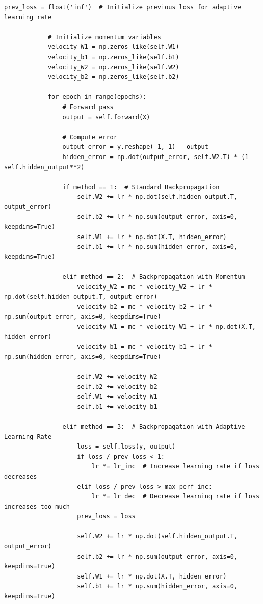\documentclass[a4paper,12pt]{article}
\begin{document}
\begin{lstlisting}[style=python]
            prev_loss = float('inf')  # Initialize previous loss for adaptive learning rate
    
            # Initialize momentum variables
            velocity_W1 = np.zeros_like(self.W1)  
            velocity_b1 = np.zeros_like(self.b1)  
            velocity_W2 = np.zeros_like(self.W2)  
            velocity_b2 = np.zeros_like(self.b2)  
    
            for epoch in range(epochs):
                # Forward pass
                output = self.forward(X)
    
                # Compute error
                output_error = y.reshape(-1, 1) - output  
                hidden_error = np.dot(output_error, self.W2.T) * (1 - self.hidden_output**2)
    
                if method == 1:  # Standard Backpropagation
                    self.W2 += lr * np.dot(self.hidden_output.T, output_error)
                    self.b2 += lr * np.sum(output_error, axis=0, keepdims=True)
                    self.W1 += lr * np.dot(X.T, hidden_error)
                    self.b1 += lr * np.sum(hidden_error, axis=0, keepdims=True)
    
                elif method == 2:  # Backpropagation with Momentum
                    velocity_W2 = mc * velocity_W2 + lr * np.dot(self.hidden_output.T, output_error)
                    velocity_b2 = mc * velocity_b2 + lr * np.sum(output_error, axis=0, keepdims=True)
                    velocity_W1 = mc * velocity_W1 + lr * np.dot(X.T, hidden_error)
                    velocity_b1 = mc * velocity_b1 + lr * np.sum(hidden_error, axis=0, keepdims=True)
    
                    self.W2 += velocity_W2
                    self.b2 += velocity_b2
                    self.W1 += velocity_W1
                    self.b1 += velocity_b1
    
                elif method == 3:  # Backpropagation with Adaptive Learning Rate
                    loss = self.loss(y, output)
                    if loss / prev_loss < 1:  
                        lr *= lr_inc  # Increase learning rate if loss decreases
                    elif loss / prev_loss > max_perf_inc:  
                        lr *= lr_dec  # Decrease learning rate if loss increases too much
                    prev_loss = loss  
    
                    self.W2 += lr * np.dot(self.hidden_output.T, output_error)
                    self.b2 += lr * np.sum(output_error, axis=0, keepdims=True)
                    self.W1 += lr * np.dot(X.T, hidden_error)
                    self.b1 += lr * np.sum(hidden_error, axis=0, keepdims=True)
    

\end{lstlisting}
\end{document}
